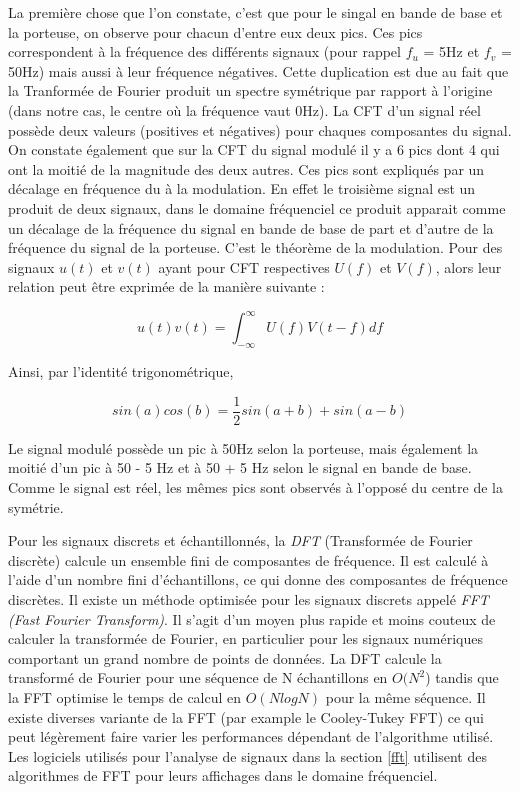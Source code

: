 La première chose que l'on constate, c'est que pour le singal en bande de base et la porteuse, on observe pour chacun d'entre eux deux pics. Ces pics correspondent à la fréquence des différents signaux (pour rappel $f_u$ = 5Hz et $f_v$ = 50Hz) mais aussi à leur fréquence négatives. Cette duplication est due au fait que la Tranformée de Fourier produit un spectre symétrique par rapport à l'origine (dans notre cas, le centre où la fréquence vaut 0Hz). La CFT d'un signal réel possède deux valeurs (positives et négatives) pour chaques composantes du signal. On constate également que sur la CFT du signal modulé il y a 6 pics dont 4 qui ont la moitié de la magnitude des deux autres. Ces pics sont expliqués par un décalage en fréquence du à la modulation. En effet le troisième signal est un produit de deux signaux, dans le domaine fréquenciel ce produit apparait comme un décalage de la fréquence du signal en bande de base de part et d'autre de la fréquence du signal de la porteuse. C'est le théorème de la modulation. Pour des signaux $u(t)$ et $v(t)$ ayant pour CFT respectives $U(f)$ et $V(f)$, alors leur relation peut être exprimée de la manière suivante :

\begin{equation}
u(t)v(t) = \int_{-\infty}^{\infty} U(f)V(t - f) df
\end{equation}

Ainsi, par l'identité trigonométrique, 

\begin{equation}
sin(a)cos(b) = \frac{1}{2} sin(a+b) + sin(a-b)
\end{equation}

Le signal modulé possède un pic à 50Hz selon la porteuse, mais également la moitié d'un pic à 50 - 5 Hz et à 50 + 5 Hz selon le signal en bande de base. Comme le signal est réel, les mêmes pics sont observés à l'opposé du centre de la symétrie.

\vspace{0.1cm}

Pour les signaux discrets et échantillonnés, la \textit{DFT} (Transformée de Fourier discrète) calcule un ensemble fini de composantes de fréquence. Il est calculé à l’aide d’un nombre fini d’échantillons, ce qui donne des composantes de fréquence discrètes. Il existe un méthode optimisée pour les signaux discrets appelé \textit{FFT (Fast Fourier Transform)}\cite{fft}. Il s'agit d'un moyen plus rapide et moins couteux de calculer la transformée de Fourier, en particulier pour les signaux numériques comportant un grand nombre de points de données. La DFT calcule la transformé de Fourier pour une séquence de N échantillons en $O(N^2$) tandis que la FFT optimise le temps de calcul en $O(N log N)$ pour la même séquence. Il existe diverses variante de la FFT (par example le Cooley-Tukey FFT\cite{fft1}) ce qui peut légèrement faire varier les performances dépendant de l'algorithme utilisé. Les logiciels utilisés pour l'analyse de signaux dans la section \ref{fft} utilisent des algorithmes de FFT pour leurs affichages dans le domaine fréquenciel.

